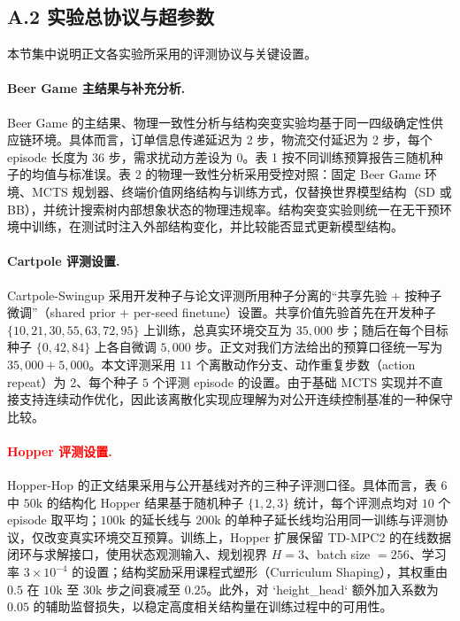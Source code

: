 \documentclass[UTF8]{ctexart}
\let\oldparagraph\paragraph
\renewcommand{\paragraph}[1]{\oldparagraph{#1}\mbox{}}
\begin{document}
\hypertarget{a.2-experimental-protocols-and-hyperparameters}{%
\subsection{A.2 实验总协议与超参数}\label{a.2-experimental-protocols-and-hyperparameters}}

本节集中说明正文各实验所采用的评测协议与关键设置。

\paragraph{Beer Game 主结果与补充分析.}
Beer Game 的主结果、物理一致性分析与结构突变实验均基于同一四级确定性供应链环境。具体而言，订单信息传递延迟为 2 步，物流交付延迟为 2 步，每个 episode 长度为 36 步，需求扰动方差设为 0。表 1 按不同训练预算报告三随机种子的均值与标准误。表 2 的物理一致性分析采用受控对照：固定 Beer Game 环境、MCTS 规划器、终端价值网络结构与训练方式，仅替换世界模型结构（SD 或 BB），并统计搜索树内部想象状态的物理违规率。结构突变实验则统一在无干预环境中训练，在测试时注入外部结构变化，并比较能否显式更新模型结构。

\paragraph{Cartpole 评测设置.}
Cartpole-Swingup 采用开发种子与论文评测所用种子分离的“共享先验 + 按种子微调”（shared prior + per-seed finetune）设置。共享价值先验首先在开发种子 \(\{10,21,30,55,63,72,95\}\) 上训练，总真实环境交互为 \(35{,}000\) 步；随后在每个目标种子 \(\{0,42,84\}\) 上各自微调 \(5{,}000\) 步。正文对我们方法给出的预算口径统一写为 \(35{,}000+5{,}000\)。本文评测采用 \(11\) 个离散动作分支、动作重复步数（action repeat）为 2、每个种子 \(5\) 个评测 episode 的设置。由于基础 MCTS 实现并不直接支持连续动作优化，因此该离散化实现应理解为对公开连续控制基准的一种保守比较。

\paragraph{\textcolor{red}{Hopper 评测设置.}}
{\color{red}
Hopper-Hop 的正文结果采用与公开基线对齐的三种子评测口径。具体而言，表 6 中 \(50\text{k}\) 的结构化 Hopper 结果基于随机种子 \(\{1,2,3\}\) 统计，每个评测点均对 \(10\) 个 episode 取平均；\(100\text{k}\) 的延长线与 \(200\text{k}\) 的单种子延长线均沿用同一训练与评测协议，仅改变真实环境交互预算。训练上，Hopper 扩展保留 TD-MPC2 的在线数据闭环与求解接口，使用状态观测输入、规划视界 \(H=3\)、batch size \(=256\)、学习率 \(3\times 10^{-4}\) 的设置；结构奖励采用课程式塑形（Curriculum Shaping），其权重由 \(0.5\) 在 \(10\text{k}\) 至 \(30\text{k}\) 步之间衰减至 \(0.25\)。此外，对 `height\_head` 额外加入系数为 \(0.05\) 的辅助监督损失，以稳定高度相关结构量在训练过程中的可用性。}
\end{document}
